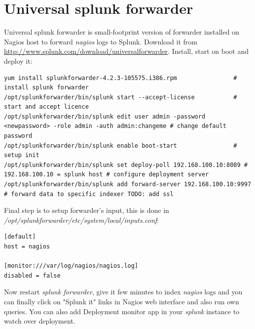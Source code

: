 \documentclass[10pt,a4paper,final]{report}
\begin{document}
\section{Universal splunk forwarder}
Universal splunk forwarder is small-footprint version of forwarder installed on Nagios host to forward \emph{nagios} logs to Splunk. Download it from \url{http://www.splunk.com/download/universalforwarder}. Install, start on boot and deploy it:
\begin{lstlisting}
yum install splunkforwarder-4.2.3-105575.i386.rpm                # install splunk forwarder
/opt/splunkforwarder/bin/splunk start --accept-license           # start and accept licence
/opt/splunkforwarder/bin/splunk edit user admin -password <newpassword> -role admin -auth admin:changeme # change default password
/opt/splunkforwarder/bin/splunk enable boot-start                # setup init
/opt/splunkforwarder/bin/splunk set deploy-poll 192.168.100.10:8089 # 192.168.100.10 = splunk host # configure deployment server
/opt/splunkforwarder/bin/splunk add forward-server 192.168.100.10:9997 # forward data to specific indexer TODO: add ssl
\end{lstlisting}
Final step is to setup forwarder's input, this is done in \emph{/opt/splunkforwarder/etc/system/local/inputs.conf}:
\begin{lstlisting}
[default]
host = nagios

[monitor:///var/log/nagios/nagios.log]
disabled = false
\end{lstlisting}
Now restart \emph{splunk forwarder}, give it few minutes to index \emph{nagios} logs and you can finally click on "Splunk it" links in Nagios web interface and also run own queries. You can also add Deployment monitor app in your \emph{splunk} instance to watch over deployment.
\end{document}
